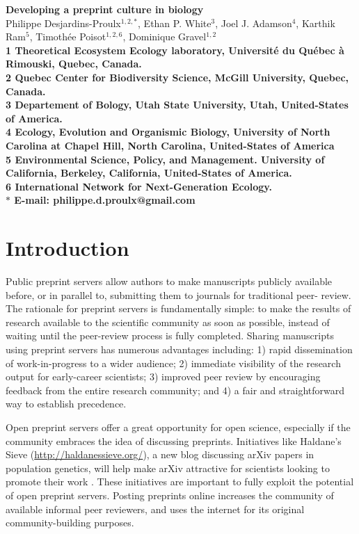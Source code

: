 \documentclass[10pt]{article}
\date{}
\begin{document}
\begin{flushleft}
{\Large
\textbf{Developing a preprint culture in biology}
}
\\
Philippe Desjardins-Proulx$^{1, 2,\ast}$, 
Ethan P. White$^{3}$, 
Joel J. Adamson$^{4}$,
Karthik Ram$^{5}$,
Timoth\'ee Poisot$^{1,2,6}$,
Dominique Gravel$^{1,2}$
\\
\bf{1} Theoretical Ecosystem Ecology laboratory, Universit\'e du Qu\'ebec \`a Rimouski, Quebec, Canada.
\\
\bf{2} Quebec Center for Biodiversity Science, McGill University, Quebec, Canada.
\\
\bf{3} Departement of Bology, Utah State University, Utah, United-States of America.
\\
\bf{4} Ecology, Evolution and Organismic Biology, University of North Carolina at Chapel Hill, North Carolina, United-States of America
\\
\bf{5} Environmental Science, Policy, and Management. University of California, Berkeley, California, United-States of America.
\\
\bf{6} International Network for Next-Generation Ecology.
\\
$\ast$ E-mail: philippe.d.proulx@gmail.com
\end{flushleft}

\section*{Introduction}

Public preprint servers allow authors to make manuscripts publicly available
before, or in parallel to, submitting them to journals for traditional peer-
review. The rationale for preprint servers is fundamentally simple: to make
the results of research available to the scientific community as
soon as possible, instead of waiting until the peer-review process is fully
completed.  Sharing manuscripts using preprint servers has numerous advantages
including: 1) rapid dissemination of work-in-progress to a wider audience; 2)
immediate visibility of the research output for early-career scientists; 3)
improved peer review by encouraging feedback from the entire research
community; and 4) a fair and straightforward way to establish precedence.

Open preprint servers offer a great opportunity for open science, especially if
the community embraces the idea of discussing preprints. Initiatives like
Haldane's Sieve (\href{http://haldanessieve.org/}{http://haldanessieve.org/}), a
new blog discussing arXiv papers in population genetics, will help make arXiv
attractive for scientists looking to promote their work \cite{lom12}. These
initiatives are important to fully exploit the potential of open preprint
servers. Posting preprints online increases the community of available informal
peer reviewers, and uses the internet for its original community-building
purposes.
\end{document}
